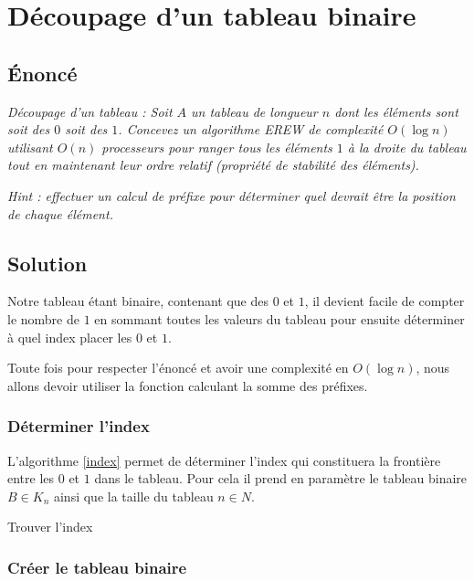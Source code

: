 \section{Découpage d'un tableau binaire}

\subsection{Énoncé}

\textit{Découpage d'un tableau : Soit $A$ un tableau de longueur $n$ dont les éléments sont soit des $0$ soit des $1$. Concevez un algorithme EREW de complexité $O(\log{n})$ utilisant $O(n)$ processeurs pour ranger tous les éléments $1$ à la droite du tableau tout en maintenant leur ordre relatif (propriété de stabilité des éléments).}

\textit{Hint : effectuer un calcul de préfixe pour déterminer quel devrait être la position de chaque élément.}

\subsection{Solution}

Notre tableau étant binaire, contenant que des $0$ et $1$, il devient facile de compter le nombre de $1$ en sommant toutes les valeurs du tableau pour ensuite déterminer à quel index placer les $0$ et $1$.

Toute fois pour respecter l'énoncé et avoir une complexité en $O(\log{n})$, nous allons devoir utiliser la fonction calculant la somme des préfixes.

\subsubsection{Déterminer l'index}

L'algorithme \ref{index} permet de déterminer l'index qui constituera la frontière entre les $0$ et $1$ dans le tableau. Pour cela il prend en paramètre le tableau binaire $B \in K_n$ ainsi que la taille du tableau $n \in N$.

\incmargin{1em}
\begin{algorithm}[here]
  \dontprintsemicolon
  \caption{Trouver l'index}
  \label{index}
\end{algorithm}
\decmargin{1em}

\subsubsection{Créer le tableau binaire}

